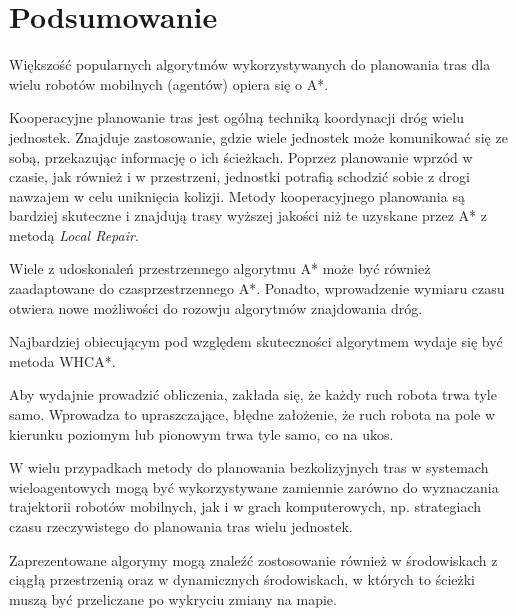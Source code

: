 \chapter{Podsumowanie}
\label{ch:podsumowanie}

Większość popularnych algorytmów wykorzystywanych do planowania tras dla wielu robotów mobilnych (agentów) opiera się o A*.

Kooperacyjne planowanie tras jest ogólną techniką koordynacji dróg wielu jednostek.
Znajduje zastosowanie, gdzie wiele jednostek może komunikować się ze sobą, przekazując informację o ich ścieżkach.
Poprzez planowanie wprzód w czasie, jak również i w przestrzeni, jednostki potrafią schodzić sobie z drogi nawzajem w celu uniknięcia kolizji.
Metody kooperacyjnego planowania są bardziej skuteczne i znajdują trasy wyższej jakości niż te uzyskane przez A* z metodą {\it Local Repair}.

Wiele z udoskonaleń przestrzennego algorytmu A* może być również zaadaptowane do czasprzestrzennego A*.
Ponadto, wprowadzenie wymiaru czasu otwiera nowe możliwości do rozowju algorytmów znajdowania dróg.

Najbardziej obiecującym pod względem skuteczności algorytmem wydaje się być metoda WHCA*.

Aby wydajnie prowadzić obliczenia, zakłada się, że każdy ruch robota trwa tyle samo. 
Wprowadza to upraszczające, błędne założenie, że ruch robota na pole w kierunku poziomym lub pionowym trwa tyle samo, co na ukos.

W wielu przypadkach metody do planowania bezkolizyjnych tras w systemach wieloagentowych mogą być wykorzystywane zamiennie zarówno do wyznaczania trajektorii robotów mobilnych, jak i w grach komputerowych, np. strategiach czasu rzeczywistego do planowania tras wielu jednostek.

Zaprezentowane algorymy mogą znaleźć zostosowanie również w środowiskach z ciągłą przestrzenią oraz w dynamicznych środowiskach, w których to ścieżki muszą być przeliczane po wykryciu zmiany na mapie.
